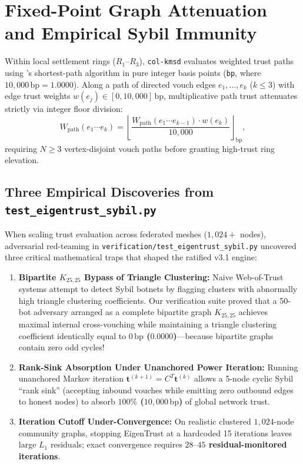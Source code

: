 \section{Fixed-Point Graph Attenuation and Empirical Sybil Immunity}
\label{sec:ch3-eigentrust-sybil}

Within local settlement rings ($R_1\text{--}R_3$), \texttt{col-kmsd} evaluates weighted trust
paths using \textcite{dijkstra1959note}'s shortest-path algorithm in pure integer basis points
(\texttt{bp}, where $10{,}000\,\mathrm{bp} = 1.0000$). Along a path of directed vouch edges
$e_1, \dots, e_k$ ($k \le 3$) with edge trust weights $w(e_j) \in [0, 10{,}000]\,\mathrm{bp}$,
multiplicative path trust attenuates strictly via integer floor division:
\[
W_{\mathrm{path}}(e_1 \cdots e_k) = \left\lfloor \frac{W_{\mathrm{path}}(e_1 \cdots e_{k-1}) \cdot w(e_k)}{10{,}000} \right\rfloor_{\mathrm{bp}},
\]
requiring $N \ge 3$ vertex-disjoint vouch paths before granting high-trust ring elevation.

\subsection{Three Empirical Discoveries from \texttt{test\_eigentrust\_sybil.py}}

When scaling trust evaluation across federated meshes ($1{,}024+$ nodes), adversarial red-teaming
in \texttt{verification/test\_eigentrust\_sybil.py} uncovered three critical mathematical traps
that shaped the ratified v3.1 engine:
\begin{enumerate}
\item \textbf{Bipartite $K_{25,25}$ Bypass of Triangle Clustering:} Naive Web-of-Trust systems
        attempt to detect Sybil botnets by flagging clusters with abnormally high triangle
        clustering coefficients. Our verification suite proved that a 50-bot adversary arranged
        as a complete bipartite graph $K_{25,25}$ achieves maximal internal cross-vouching while
        maintaining a triangle clustering coefficient identically equal to \textbf{$0\,\mathrm{bp}$
        ($0.0000$)}---because bipartite graphs contain zero odd cycles!
\item \textbf{Rank-Sink Absorption Under Unanchored Power Iteration:} Running unanchored Markov
        iteration $\mathbf{t}^{(k+1)} = C^T \mathbf{t}^{(k)}$ allows a 5-node cyclic Sybil
        ``rank sink'' (accepting inbound vouches while emitting zero outbound edges to honest
        nodes) to absorb \textbf{$100\%$ ($10{,}000\,\mathrm{bp}$)} of global network trust.
\item \textbf{Iteration Cutoff Under-Convergence:} On realistic clustered $1{,}024$-node
        community graphs, stopping EigenTrust at a hardcoded 15 iterations leaves large $L_1$
        residuals; exact convergence requires \textbf{$28\text{--}45$ residual-monitored iterations}.
\end{enumerate}

